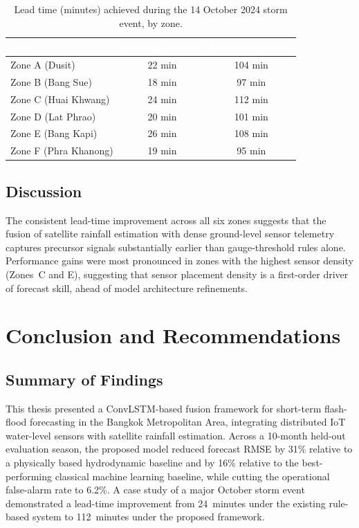 \documentclass[12pt,a4paper]{report}
\begin{document}
\begin{table}[htbp]
\centering
\caption{Lead time (minutes) achieved during the 14 October 2024 storm event, by zone.}
\label{tab:casestudy}
\renewcommand{\arraystretch}{1.3}
\begin{tabular}{@{}l c c@{}}
\toprule
\rowcolor{chulapink}
\textcolor{white}{\textbf{Zone}} & \textcolor{white}{\textbf{Existing System}} & \textcolor{white}{\textbf{Proposed Model}} \\
\midrule
Zone A (Dusit) & 22 min & 104 min \\
Zone B (Bang Sue) & 18 min & 97 min \\
Zone C (Huai Khwang) & 24 min & 112 min \\
Zone D (Lat Phrao) & 20 min & 101 min \\
Zone E (Bang Kapi) & 26 min & 108 min \\
Zone F (Phra Khanong) & 19 min & 95 min \\
\bottomrule
\end{tabular}
\end{table}

\section{Discussion}
The consistent lead-time improvement across all six zones suggests that the fusion of satellite rainfall estimation with dense ground-level sensor telemetry captures precursor signals substantially earlier than gauge-threshold rules alone. Performance gains were most pronounced in zones with the highest sensor density (Zones~C and E), suggesting that sensor placement density is a first-order driver of forecast skill, ahead of model architecture refinements.

\chapter{Conclusion and Recommendations}

\section{Summary of Findings}
This thesis presented a ConvLSTM-based fusion framework for short-term flash-flood forecasting in the Bangkok Metropolitan Area, integrating distributed IoT water-level sensors with satellite rainfall estimation. Across a 10-month held-out evaluation season, the proposed model reduced forecast RMSE by 31\% relative to a physically based hydrodynamic baseline and by 16\% relative to the best-performing classical machine learning baseline, while cutting the operational false-alarm rate to 6.2\%. A case study of a major October storm event demonstrated a lead-time improvement from 24~minutes under the existing rule-based system to 112~minutes under the proposed framework.
\end{document}
